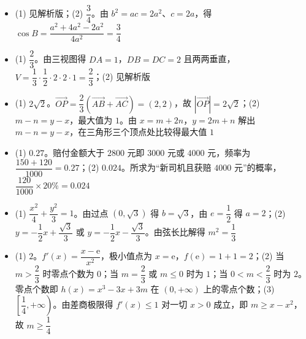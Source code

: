 \begin{itemize}[leftmargin=2.6em]
  \item[\textbf{16.}] (1) 见解析版；(2) $\dfrac34$。由 $b^2=ac=2a^2$、$c=2a$，得 $\cos B=\dfrac{a^2+4a^2-2a^2}{4a^2}=\dfrac34$
  \item[\textbf{17.}] (1) $\dfrac23$。由三视图得 $DA=1$，$DB=DC=2$ 且两两垂直，$V=\dfrac13\cdot\dfrac12\cdot2\cdot2\cdot1=\dfrac23$；(2) 见解析版
  \item[\textbf{18.}] (1) $2\sqrt2$。$\overrightarrow{OP}=\dfrac23(\overrightarrow{AB}+\overrightarrow{AC})=(2,2)$，故 $|\overrightarrow{OP}|=2\sqrt2$；(2) $m-n=y-x$，最大值为 $1$。由 $x=m+2n$，$y=2m+n$ 解出 $m-n=y-x$，在三角形三个顶点处比较得最大值 $1$
  \item[\textbf{19.}] (1) $0.27$。赔付金额大于 $2800$ 元即 $3000$ 元或 $4000$ 元，频率为 $\dfrac{150+120}{1000}=0.27$；(2) $0.024$。所求为“新司机且获赔 $4000$ 元”的概率，$\dfrac{120}{1000}\times20\%=0.024$
  \item[\textbf{20.}] (1) $\dfrac{x^2}{4}+\dfrac{y^2}{3}=1$。由过点 $(0,\sqrt3)$ 得 $b=\sqrt3$，由 $e=\dfrac12$ 得 $a=2$；(2) $y=-\dfrac12x+\dfrac{\sqrt3}{3}$ 或 $y=-\dfrac12x-\dfrac{\sqrt3}{3}$。由弦长比解得 $m^2=\dfrac13$
  \item[\textbf{21.}] (1) $2$。$f'(x)=\dfrac{x-\mathrm e}{x^2}$，极小值点为 $x=\mathrm e$，$f(\mathrm e)=1+1=2$；(2) 当 $m>\dfrac23$ 时零点个数为 $0$；当 $m=\dfrac23$ 或 $m\leqslant0$ 时为 $1$；当 $0<m<\dfrac23$ 时为 $2$。零点个数即 $h(x)=x^3-3x+3m$ 在 $(0,+\infty)$ 上的零点个数；(3) $\left[\dfrac14,+\infty\right)$。由差商极限得 $f'(x)\leqslant1$ 对一切 $x>0$ 成立，即 $m\geqslant x-x^2$，故 $m\geqslant\dfrac14$
\end{itemize}
